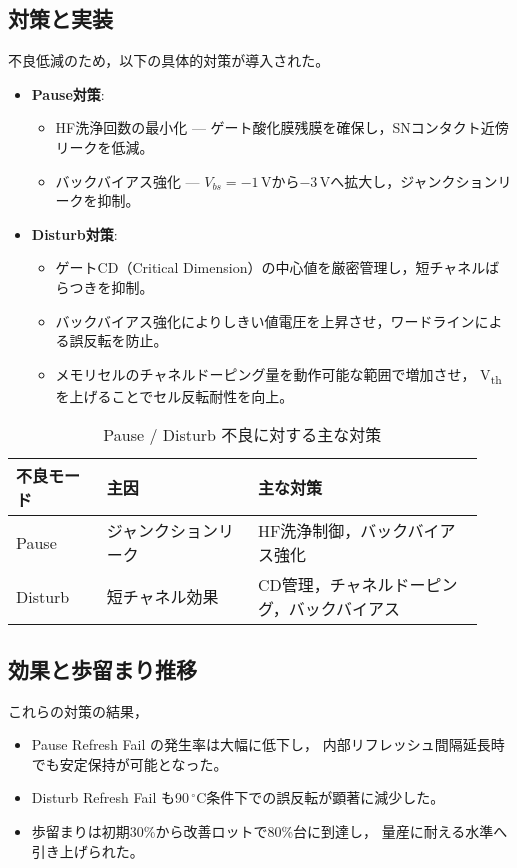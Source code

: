 \documentclass[conference]{IEEEtran}
\begin{document}
\subsection{対策と実装}
不良低減のため，以下の具体的対策が導入された。
\begin{itemize}
  \item \textbf{Pause対策}:
    \begin{itemize}
      \item HF洗浄回数の最小化 — ゲート酸化膜残膜を確保し，SNコンタクト近傍リークを低減。
      \item バックバイアス強化 — $V_{bs}=-1$\,Vから$-3$\,Vへ拡大し，ジャンクションリークを抑制。
    \end{itemize}
  \item \textbf{Disturb対策}:
    \begin{itemize}
      \item ゲートCD（Critical Dimension）の中心値を厳密管理し，短チャネルばらつきを抑制。
      \item バックバイアス強化によりしきい値電圧を上昇させ，ワードラインによる誤反転を防止。
      \item メモリセルのチャネルドーピング量を動作可能な範囲で増加させ，
            V\textsubscript{th} を上げることでセル反転耐性を向上。
    \end{itemize}
\end{itemize}

\begin{table}[t]
\centering
\caption{Pause / Disturb 不良に対する主な対策}
\begin{tabular}{p{0.18\linewidth} p{0.30\linewidth} p{0.45\linewidth}}
\toprule
不良モード & 主因 & 主な対策 \\
\midrule
Pause   & ジャンクションリーク & HF洗浄制御，バックバイアス強化 \\
Disturb & 短チャネル効果       & CD管理，チャネルドーピング，バックバイアス \\
\bottomrule
\end{tabular}
\end{table}

\subsection{効果と歩留まり推移}
これらの対策の結果，
\begin{itemize}
  \item Pause Refresh Fail の発生率は大幅に低下し，
        内部リフレッシュ間隔延長時でも安定保持が可能となった。
  \item Disturb Refresh Fail も90\,$^\circ$C条件下での誤反転が顕著に減少した。
  \item 歩留まりは初期30\%から改善ロットで80\%台に到達し，
        量産に耐える水準へ引き上げられた。
\end{itemize}
\end{document}
